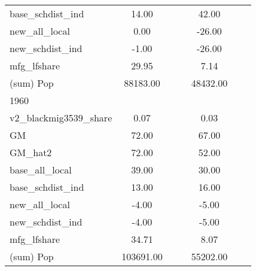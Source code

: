 \begin{table}[htbp]
\begin{tabular}{l*{2}{ccc}}
base\_schdist\_ind    &       14.00&            &            &       42.00&            &            \\
new\_all\_local       &        0.00&            &            &      -26.00&            &            \\
new\_schdist\_ind     &       -1.00&            &            &      -26.00&            &            \\
mfg\_lfshare         &       29.95&            &            &        7.14&            &            \\
(sum) Pop           &    88183.00&            &            &    48432.00&            &            \\
\midrule
1960                &            &            &            &            &            &            \\
v2\_blackmig3539\_share&        0.07&            &            &        0.03&            &            \\
GM                  &       72.00&            &            &       67.00&            &            \\
GM\_hat2             &       72.00&            &            &       52.00&            &            \\
base\_all\_local      &       39.00&            &            &       30.00&            &            \\
base\_schdist\_ind    &       13.00&            &            &       16.00&            &            \\
new\_all\_local       &       -4.00&            &            &       -5.00&            &            \\
new\_schdist\_ind     &       -4.00&            &            &       -5.00&            &            \\
mfg\_lfshare         &       34.71&            &            &        8.07&            &            \\
(sum) Pop           &   103691.00&            &            &    55202.00&            &            \\
\bottomrule
\end{tabular}
\end{table}
